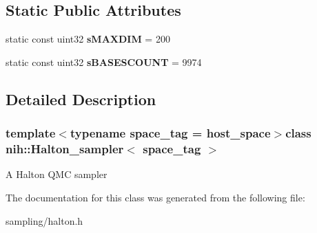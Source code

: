 \subsection*{\-Static \-Public \-Attributes}
\begin{DoxyCompactItemize}
\item 
\hypertarget{classnih_1_1_halton__sampler_a3d789d0a1c647db400142f5fb06d9776}{
static const uint32 {\bfseries s\-M\-A\-X\-D\-I\-M} = 200}
\label{classnih_1_1_halton__sampler_a3d789d0a1c647db400142f5fb06d9776}

\item 
\hypertarget{classnih_1_1_halton__sampler_ac1a93f3c43b48c795d26c4f868c78f0f}{
static const uint32 {\bfseries s\-B\-A\-S\-E\-S\-C\-O\-U\-N\-T} = 9974}
\label{classnih_1_1_halton__sampler_ac1a93f3c43b48c795d26c4f868c78f0f}

\end{DoxyCompactItemize}


\subsection{\-Detailed \-Description}
\subsubsection*{template$<$typename space\-\_\-tag = host\-\_\-space$>$class nih\-::\-Halton\-\_\-sampler$<$ space\-\_\-tag $>$}

\-A \-Halton \-Q\-M\-C sampler 

\-The documentation for this class was generated from the following file\-:\begin{DoxyCompactItemize}
\item 
sampling/halton.\-h\end{DoxyCompactItemize}
